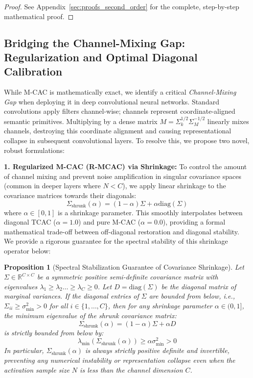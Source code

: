 \documentclass{article}
\theoremstyle{plain}
\newtheorem{proposition}[theorem]{Proposition}
\theoremstyle{definition}
\theoremstyle{remark}
\begin{document}
\begin{proof}
See Appendix~\ref{sec:proofs_second_order} for the complete, step-by-step mathematical proof.
\end{proof}

\subsection{Bridging the Channel-Mixing Gap: Regularization and Optimal Diagonal Calibration}
While M-CAC is mathematically exact, we identify a critical \textit{Channel-Mixing Gap} when deploying it in deep convolutional neural networks. Standard convolutions apply filters channel-wise; channels represent coordinate-aligned semantic primitives. Multiplying by a dense matrix $M = \Sigma_k^{1/2} \Sigma_M^{-1/2}$ linearly mixes channels, destroying this coordinate alignment and causing representational collapse in subsequent convolutional layers. To resolve this, we propose two novel, robust formulations:

\textbf{1. Regularized M-CAC (R-MCAC) via Shrinkage:}
To control the amount of channel mixing and prevent noise amplification in singular covariance spaces (common in deeper layers where $N < C$), we apply linear shrinkage to the covariance matrices towards their diagonals:
\begin{equation}
  \Sigma_{\text{shrunk}}(\alpha) = (1 - \alpha) \Sigma + \alpha \text{diag}(\Sigma)
\end{equation}
where $\alpha \in [0, 1]$ is a shrinkage parameter. This smoothly interpolates between diagonal TCAC ($\alpha = 1.0$) and pure M-CAC ($\alpha = 0.0$), providing a formal mathematical trade-off between off-diagonal restoration and diagonal stability. We provide a rigorous guarantee for the spectral stability of this shrinkage operator below:

\begin{proposition}[Spectral Stabilization Guarantee of Covariance Shrinkage]
Let $\Sigma \in \mathbb{R}^{C \times C}$ be a symmetric positive semi-definite covariance matrix with eigenvalues $\lambda_1 \geq \lambda_2 \dots \geq \lambda_C \geq 0$. Let $D = \text{diag}(\Sigma)$ be the diagonal matrix of marginal variances. If the diagonal entries of $\Sigma$ are bounded from below, i.e., $\Sigma_{ii} \geq \sigma_{\min}^2 > 0$ for all $i \in \{1, \dots, C\}$, then for any shrinkage parameter $\alpha \in (0, 1]$, the minimum eigenvalue of the shrunk covariance matrix:
\begin{equation}
  \Sigma_{\text{shrunk}}(\alpha) = (1 - \alpha) \Sigma + \alpha D
\end{equation}
is strictly bounded from below by:
\begin{equation}
  \lambda_{\min}\left(\Sigma_{\text{shrunk}}(\alpha)\right) \geq \alpha \sigma_{\min}^2 > 0
\end{equation}
In particular, $\Sigma_{\text{shrunk}}(\alpha)$ is always strictly positive definite and invertible, preventing any numerical instability or representation collapse even when the activation sample size $N$ is less than the channel dimension $C$.
\end{proposition}
\end{document}

